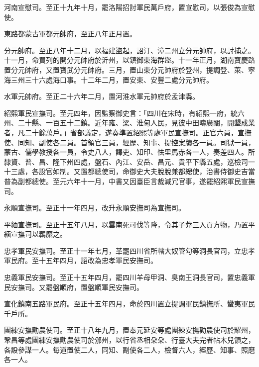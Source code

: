 \begin{pinyinscope}
 河南宣慰司。至正十九年十月，罷洛陽招討軍民萬戶府，置宣慰司，以張俊為宣慰使。



 東路都蒙古軍都元帥府，至正八年正月置。



 分元帥府。至正八年十二月，以福建盜起，詔汀、漳二州立分元帥府，以討捕之。十一月，命買列的開分元帥府於沂州，以鎮御東海群盜。十一年正月，湖南寶慶路置分元帥府，又置寶武分元帥府。三月，置山東分元帥府於登州，提調登、萊、寧海三州三十六處海口事。十二年二月，置安東、安豐二處分元帥府。



 水軍元帥府。至正二十六年二月，置河淮水軍元帥府於孟津縣。



 紹熙軍民宣撫司。至元四年，因監察御史言：「四川在宋時，有紹熙一府，統六州、二十縣、一百五十二鎮。近年雍、梁、淮甸人民，見彼中田疇廣闊，開墾成業者，凡二十餘萬戶。」省部議定，遂奏準置紹熙等處軍民宣撫司。正官六員，宣撫使、同知、副使各二員。首領官三員，經歷、知事、提控案牘各一員。司獄一員，蒙古、儒學教授各一員，令史八人，譯吏、知印、怯里馬赤各一人，奏差四人。所隸資、普、昌、隆下州四處，盤石、內江、安岳、昌元、貴平下縣五處，巡檢司一十三處，各設官如制。又置都總使司，命御史大夫脫脫兼都總使，治書侍御史吉當普為副都總使。至元六年十一月，中書又因臺臣言裁減冗官事，遂罷紹熙軍民宣撫司。



 永順宣撫司。至正十一年四月，改升永順安撫司為宣撫司。



 平緬宣撫司。至正十五年八月，以雲南死可伐等降，令其子莽三入貢方物，乃置平緬宣撫司以羈縻之。



 忠孝軍民安撫司。至正十一年七月，革罷四川省所轄大奴管勾等洞長官司，立忠孝軍民府。至十五年四月，詔改為忠孝軍民安撫司。



 忠義軍民安撫司。至正十五年四月，罷四川羊母甲洞、臭南王洞長官司，置忠義軍民安撫司。又罷盤順府，置盤順軍民安撫司。



 宣化鎮南五路軍民府。至正十五年四月，命於四川置立提調軍民鎮撫所、蠻夷軍民千戶所。



 團練安撫勸農使司。至正十八年九月，置奉元延安等處團練安撫勸農使司於耀州，鞏昌等處團練安撫勸農使司於邠州，以行省丞相朵朵、行臺大夫完者帖木兒領之，各設參謀一人。每道置使二人，同知、副使各二人，檢督六人，經歷、知事、照磨各一人。




\end{pinyinscope}
